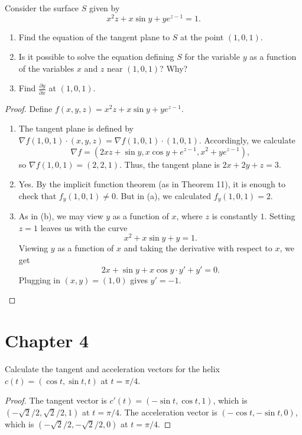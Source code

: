\documentclass[openany]{book}
\begin{document}
\begin{prob}[38]
    Consider the surface \( S \) given by
    \[
    x^2z + x \sin y + ye^{z-1} = 1.
    \]
    \begin{enumerate}
        \item[(a)] Find the equation of the tangent plane to \( S \) at the point \( (1, 0, 1) \).
        \item[(b)] Is it possible to solve the equation defining \( S \) for the variable \( y \) as a function of the variables \( x \) and \( z \) near \( (1, 0, 1) \)? Why?
        \item[(c)] Find \( \frac{\partial y}{\partial x} \) at \( (1, 0, 1) \).
    \end{enumerate}
\end{prob}
\begin{proof}
    Define $f(x,y,z)=x^2z+x\sin y+ye^{z-1}$.
    \begin{enumerate}
        \item[(a)] The tangent plane is defined by $\nabla f(1,0,1)\cdot(x,y,z)=\nabla f(1,0,1)\cdot(1,0,1)$. Accordingly, we calculate
        \[\nabla f=\left(2xz+\sin y,x\cos y+e^{z-1},x^2+ye^{z-1}\right),\]
        so $\nabla f(1,0,1)=(2,2,1)$. Thus, the tangent plane is $2x+2y+z=3$.
        \item[(b)] Yes. By the implicit function theorem (as in Theorem 11), it is enough to check that $f_y(1,0,1)\ne0$. But in (a), we calculated $f_y(1,0,1)=2$.
        \item[(c)] As in (b), we may view $y$ as a function of $x$, where $z$ is constantly $1$. Setting $z=1$ leaves us with the curve
        \[x^2+x\sin y+y=1.\]
        Viewing $y$ as a function of $x$ and taking the derivative with respect to $x$, we get
        \[2x+\sin y+x\cos y\cdot y'+y'=0.\]
        Plugging in $(x,y)=(1,0)$ gives $y'=-1$.
        \qedhere
    \end{enumerate}
\end{proof}




\section{Chapter 4}
\begin{prob}[5]
    Calculate the tangent and acceleration vectors for the helix \( c(t) = (\cos t, \sin t, t) \) at \( t = \pi/4 \).
\end{prob}
\begin{proof}
    The tangent vector is $c'(t)=(-\sin t,\cos t,1)$, which is $(-\sqrt2/2,\sqrt2/2,1)$ at $t=\pi/4$. The acceleration vector is $(-\cos t,-\sin t,0)$, which is $(-\sqrt2/2,-\sqrt2/2,0)$ at $t=\pi/4$.
\end{proof}
\end{document}
